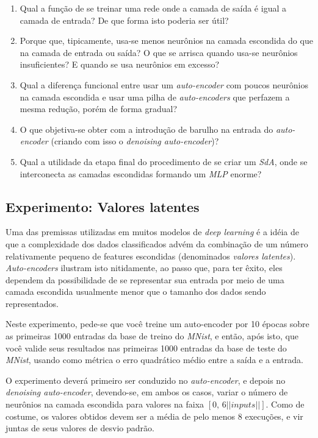 \documentclass[12pt, a4paper]{article}
\begin{document}
\begin{enumerate}
\item Qual a função de se treinar uma rede onde a camada de saída é igual a camada de entrada? De que forma isto poderia ser útil?
\item Porque que, tipicamente, usa-se menos neurônios na camada escondida do que na camada de entrada ou saída? O que se arrisca quando usa-se neurônios insuficientes? E quando se usa neurônios em excesso?
\item Qual a diferença funcional entre usar um \emph{auto-encoder} com poucos neurônios na camada escondida e usar uma pilha de \emph{auto-encoders} que perfazem a mesma redução, porém de forma gradual?
\item O que objetiva-se obter com a introdução de barulho na entrada do \emph{auto-encoder} (criando com isso o \emph{denoising auto-encoder})?
\item Qual a utilidade da etapa final do procedimento de se criar um \emph{SdA}, onde se interconecta as camadas escondidas formando um \emph{MLP} enorme?
\end{enumerate}

\subsection{Experimento: Valores latentes}

Uma das premissas utilizadas em muitos modelos de \emph{deep learning} é a idéia de que a complexidade dos dados classificados advém da combinação de um número relativamente pequeno de features escondidas (denominados \emph{valores latentes}). \emph{Auto-encoders} ilustram isto nitidamente, ao passo que, para ter êxito, eles dependem da possibilidade de se representar sua entrada por meio de uma camada escondida usualmente menor que o tamanho dos dados sendo representados.

Neste experimento, pede-se que você treine um auto-encoder por 10 épocas sobre as primeiras 1000 entradas da base de treino do \emph{MNist}, e então, após isto, que você valide seus resultados nas primeiras 1000 entradas da base de teste do \emph{MNist}, usando como métrica o erro quadrático médio entre a saída e a entrada.

O experimento deverá primeiro ser conduzido no \emph{auto-encoder}, e depois no \emph{denoising auto-encoder}, devendo-se, em ambos os casos, variar o número de neurônios na camada escondida para valores na faixa $[0\text{, }6||inputs||]$. Como de costume, os valores obtidos devem ser a média de pelo menos 8 execuções, e vir juntas de seus valores de desvio padrão.
\end{document}

